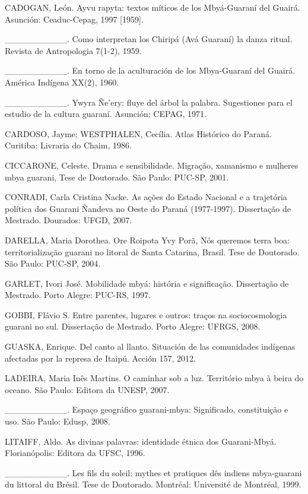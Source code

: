 \documentclass{article}
\begin{document}
CADOGAN, Le\'on. Ayvu rapyta: textos m\'iticos de los Mby\'a-Guaran\'i
del Guair\'a. Asunci\'on: Ceaduc-Cepag, 1997 [1959].

\_\_\_\_\_\_\_\_\_\_. Como interpretan los Chirip\'a (Av\'a Guaran\'i)
la danza ritual. Revista de Antropologia 7(1-2), 1959.

\_\_\_\_\_\_\_\_\_\_. En torno de la aculturaci\'on de los
Mbya-Guaran\'i del Guair\'a. Am\'erica Ind\'igena XX(2), 1960. 

\_\_\_\_\_\_\_\_\_\_. Ywyra \~Ne{\textquoteright}ery: fluye del \'arbol
la palabra. Sugestiones para el estudio de la cultura guaran\'i.
Asunci\'on: CEPAG, 1971.

CARDOSO, Jayme; WESTPHALEN, Cec\'ilia. Atlas Hist\'orico do Paran\'a.
Curitiba: Livraria do Chaim, 1986.

CICCARONE, Celeste. Drama e sensibilidade. Migra\c{c}\~ao, xamanismo e
mulheres mbya guarani, Tese de Doutorado. S\~ao Paulo: PUC-SP, 2001.

CONRADI, Carla Cristina Nacke. As a\c{c}\~oes do Estado Nacional e a
trajet\'oria pol\'itica dos Guarani \~Nandeva no Oeste do Paran\'a
(1977-1997). Disserta\c{c}\~ao de Mestrado. Dourados: UFGD, 2007.

DARELLA, Maria Dorothea. Ore Roipota Yvy Por\~a, N\'os queremos terra
boa: territorializa\c{c}\~ao guarani no litoral de Santa Catarina,
Brasil. Tese de Doutorado. S\~ao Paulo: PUC-SP, 2004.

GARLET, Ivori Jos\'e.  Mobilidade mby\'a: hist\'oria e
significa\c{c}\~ao. Disserta\c{c}\~ao de Mestrado. Porto Alegre:
PUC-RS, 1997.

GOBBI, Fl\'avio S. Entre parentes, lugares e outros: tra\c{c}os na
sociocosmologia guarani no sul. Disserta\c{c}\~ao de Mestrado. Porto
Alegre: UFRGS, 2008.

GUASKA, Enrique. Del canto al llanto. Situaci\'on de las comunidades
ind\'igenas afectadas por la represa de Itaip\'u. Acci\'on 157, 2012.

LADEIRA, Maria In\^es Martins. O caminhar sob a luz. Territ\'orio mbya
\`a beira do oceano. S\~ao Paulo: Editora da UNESP, 2007.

\_\_\_\_\_\_\_\_\_\_. Espa\c{c}o geogr\'afico guarani-mbya: Significado,
constitui\c{c}\~ao e uso. S\~ao Paulo: Edusp, 2008.

LITAIFF, Aldo. As divinas palavras: identidade \'etnica dos
Guarani-Mby\'a. Florian\'opolis: Editora da UFSC, 1996.

\_\_\_\_\_\_\_\_\_\_. Les fils du soleil: mythes et pratiques d\^es
indiens mbya-guarani du littoral du Br\'esil. Tese de Doutorado.
Montr\'eal: Universit\'e de Montr\'eal, 1999.
\end{document}
